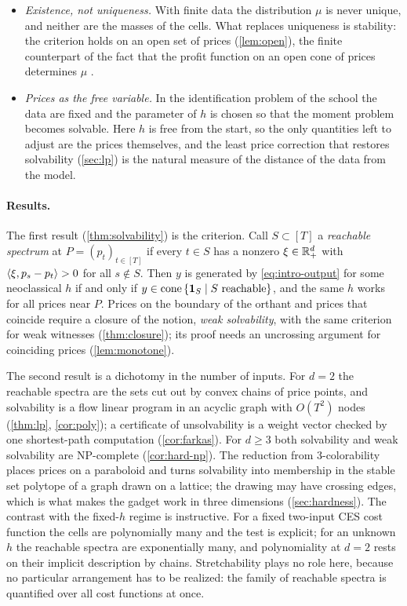 \begin{itemize}
\item \emph{Existence, not uniqueness.} With finite data the distribution $\mu$ is never unique, and neither are the masses of the cells. What replaces uniqueness is stability: the criterion holds on an open set of prices (\cref{lem:open}), the finite counterpart of the fact that the profit function on an open cone of prices determines $\mu$ \citep[Thm.~2.1]{AgaltsovMolchanovShananin2018}.
\item \emph{Prices as the free variable.} In the identification problem of the school the data are fixed and the parameter of $h$ is chosen so that the moment problem becomes solvable. Here $h$ is free from the start, so the only quantities left to adjust are the prices themselves, and the least price correction that restores solvability (\cref{sec:lp}) is the natural measure of the distance of the data from the model.
\end{itemize}

\paragraph{Results.}
The first result (\cref{thm:solvability}) is the criterion. Call $S\subset[T]$ a \emph{reachable spectrum} at $P=(p_t)_{t\in[T]}$ if every $t\in S$ has a nonzero $\xi\in\Rp[d]$ with $\ip\xi{p_s-p_t}>0$ for all $s\notin S$. Then $y$ is generated by \eqref{eq:intro-output} for some neoclassical $h$ if and only if $y\in\cone\set{\ind S\mid S\text{ reachable}}$, and the same $h$ works for all prices near $P$. Prices on the boundary of the orthant and prices that coincide require a closure of the notion, \emph{weak solvability}, with the same criterion for weak witnesses (\cref{thm:closure}); its proof needs an uncrossing argument for coinciding prices (\cref{lem:monotone}).

The second result is a dichotomy in the number of inputs. For $d=2$ the reachable spectra are the sets cut out by convex chains of price points, and solvability is a flow linear program in an acyclic graph with $O(T^2)$ nodes (\cref{thm:lp}, \cref{cor:poly}); a certificate of unsolvability is a weight vector checked by one shortest-path computation (\cref{cor:farkas}). For $d\ge3$ both solvability and weak solvability are NP-complete (\cref{cor:hard-np}). The reduction from 3-colorability places prices on a paraboloid and turns solvability into membership in the stable set polytope of a graph drawn on a lattice; the drawing may have crossing edges, which is what makes the gadget work in three dimensions (\cref{sec:hardness}). The contrast with the fixed-$h$ regime is instructive. For a fixed two-input CES cost function the cells are polynomially many and the test is explicit; for an unknown $h$ the reachable spectra are exponentially many, and polynomiality at $d=2$ rests on their implicit description by chains. Stretchability plays no role here, because no particular arrangement has to be realized: the family of reachable spectra is quantified over all cost functions at once.

